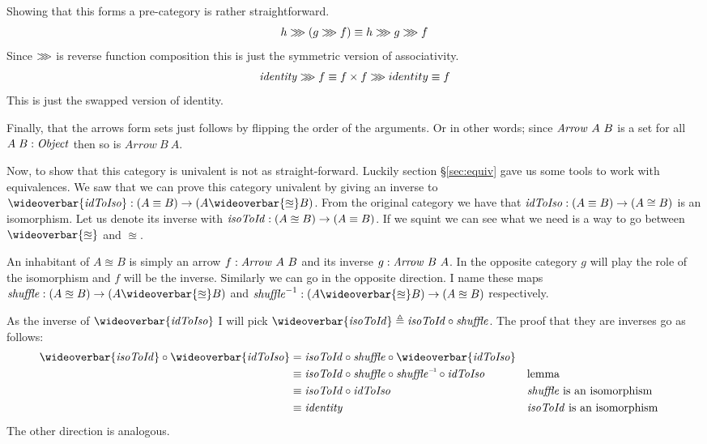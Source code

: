 Showing that this forms a pre-category is rather straightforward. 
%
$$
h \ggg (g \ggg f) \equiv h \ggg g \ggg f
$$
%
Since $\ggg$ is reverse function composition this is just the symmetric version
of associativity.
%
$$
\identity \rrr f \equiv f \x f \rrr identity \equiv f
$$
%
This is just the swapped version of identity.

Finally, that the arrows form sets just follows by flipping the order of the
arguments. Or in other words; since $\Arrow\ A\ B$ is a set for all $A\;B \tp
\Object$ then so is $Arrow\ B\ A$.

Now, to show that this category is univalent is not as straight-forward. Luckily
section \S\ref{sec:equiv} gave us some tools to work with equivalences. We saw
that we can prove this category univalent by giving an inverse to
$\wideoverbar{\idToIso} \tp (A \equiv B) \to (A \wideoverbar{\approxeq} B)$.
From the original category we have that $\idToIso \tp (A \equiv B) \to (A \cong
B)$ is an isomorphism. Let us denote its inverse with $\isoToId \tp (A
\approxeq B) \to (A \equiv B)$. If we squint we can see what we need is a way to
go between $\wideoverbar{\approxeq}$ and $\approxeq$.

An inhabitant of $A \approxeq B$ is simply an arrow $f \tp \Arrow\ A\ B$
and its inverse $g \tp \Arrow\ B\ A$. In the opposite category $g$ will
play the role of the isomorphism and $f$ will be the inverse. Similarly we can
go in the opposite direction. I name these maps $\shuffle \tp (A \approxeq
B) \to (A \wideoverbar{\approxeq} B)$ and $\shuffle^{-1} \tp (A
\wideoverbar{\approxeq} B) \to (A \approxeq B)$ respectively.

As the inverse of $\wideoverbar{\idToIso}$ I will pick $\wideoverbar{\isoToId}
\defeq \isoToId \comp \shuffle$. The proof that they are inverses go as
follows:
%
\begin{align*}
\wideoverbar{\isoToId} \comp \wideoverbar{\idToIso} & =
\isoToId \comp \shuffle \comp \wideoverbar{\idToIso}
\\
%
& \equiv
\isoToId \comp \shuffle \comp \inv{\shuffle} \comp \idToIso
&& \text{lemma} \\
& \equiv
\isoToId \comp \idToIso
&& \text{$\shuffle$ is an isomorphism} \\
& \equiv
\identity
&& \text{$\isoToId$ is an isomorphism}
\end{align*}
%
The other direction is analogous.

